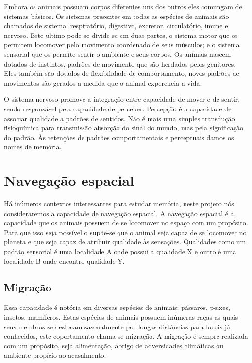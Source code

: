 Embora os animais possuam corpos diferentes uns dos outros eles comungam de sistemas básicos.
Os sistemas presentes em todas as espécies de animais são chamados de sistema: respiratório, digestivo, excretor, circulatório, imune e nervoso.
Este ultimo pode se divide-se em duas partes, o sistema motor que os permitem locomover pelo movimento coordenado de seus músculos; e o sistema sensorial que os permite sentir o ambiente e seus corpos.
Os animais nascem dotados de instintos, padrões de movimento que são herdados pelos genitores.
Eles também são dotados de flexibilidade de comportamento, novos padrões de movimentos são gerados a medida que o animal experencia a vida.

O sistema nervoso promove a integração entre capacidade de mover e de sentir, sendo responsável pela capacidade de perceber.
Percepção é a capacidade de associar qualidade a padrões de sentidos.
Não é mais uma simples transdução fisioquímica para transmissão absorção do sinal do mundo, mas pela significação do padrão.
Às retenções de padrões comportamentais e perceptuais damos os nomes de memória.

\section{Navegação espacial}

Há inúmeros contextos interessantes para estudar memória, neste projeto nós consideraremos a capacidade de navegação espacial.
A navegação espacial é a capacidade que os animais possuem de se locomover no espaço com um propósito.
Para que isso seja possível o supõe-se que o animal seja capaz de se locomover no planeta e que seja capaz de atribuir qualidade às sensações.
Qualidades como um padrão sensorial é uma localidade A onde possui a qualidade X e outro é uma localidade B onde encontro qualidade Y.

\subsection{Migração}
Essa capacidade é notória em diversas espécies de animais: pássaros, peixes, insetos, mamíferos.
Estas espécies de animais possuem inúmeras raças as quais seus membros se deslocam sasonalmente por longas distâncias para locais já conhecidos, este coportamento chama-se migração.
A migração é sempre realizada com um propósito, seja alimentação, abrigo de adversidades climáticas ou ambiente propício ao acasalmento.

